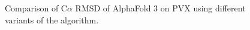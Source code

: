 


\begin{figure}

\caption{Comparison of C$\alpha$ RMSD of AlphaFold 3 on PVX using different variants of the algorithm. }
\label{fig:af3_rmsd_cdf}
\end{figure}